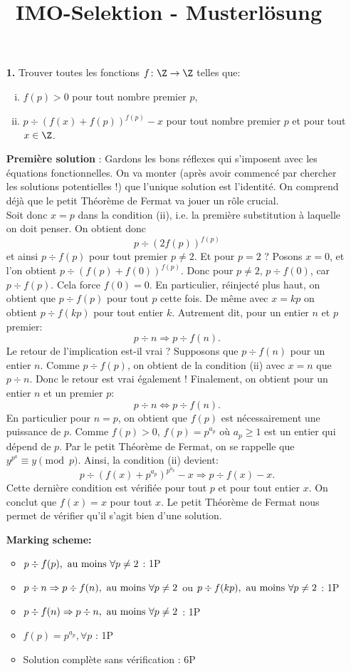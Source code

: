 \documentclass[language=german,style=solution]{smo}
\title{IMO-Selektion - Musterlösung}
\begin{document}
\begin{enumerate}

\item[\textbf{1.}] %
Trouver toutes les fonctions $f\colon \Z \to \Z$ telles que:
\begin{enumerate}[(i)] 
\item $f(p) > 0$ pour tout nombre premier $p$,
\item $p \div (f(x) + f(p))^{f(p)} - x$ pour tout nombre premier $p$ et pour tout $x \in \Z$. 
\end{enumerate}

\textbf{Première solution} : Gardons les bons réflexes qui s'imposent avec les équations fonctionnelles. On va monter (après avoir commencé par chercher les solutions potentielles !) que l'unique solution est l'identité. On comprend déjà que le petit Théorème de Fermat va jouer un rôle crucial.\\
Soit donc $x=p$ dans la condition (ii), i.e. la première substitution à laquelle on doit penser. On obtient donc
\[
p\div (2f(p))^{f(p)}
\]
et ainsi $p\div f(p)$ pour tout premier $p\neq 2$. Et pour $p=2$ ? Posons $x=0$, et l'on obtient $p\div (f(p)+f(0))^{f(p)}$. Donc pour $p\neq 2$, $p\div f(0)$, car $p\div f(p)$. Cela force $f(0)=0$. En particulier, réinjecté plus haut, on obtient que $p\div f(p)$ pour tout $p$ cette fois.\newline
De même avec $x=kp$ on obtient $p\div f(kp)$ pour tout entier $k$. Autrement dit, pour un entier $n$ et $p$ premier:
\[
p\div n\Rightarrow p\div f(n).
\]
Le retour de l'implication est-il vrai ? Supposons que $p\div f(n)$ pour un entier $n$. Comme $p\div f(p)$, on obtient de la condition (ii) avec $x=n$ que $p\div n$. Donc le retour est vrai également ! Finalement, on obtient pour un entier $n$ et un premier $p$:
\[
p\div n\Leftrightarrow p\div f(n).
\]
En particulier pour $n=p$, on obtient que $f(p)$ est nécessairement une puissance de $p$. Comme $f(p)>0$, $f(p)=p^{a_p}$ où $a_p\geq 1$ est un entier qui dépend de $p$. Par le petit Théorème de Fermat, on se rappelle que $y^{p^{a}}\equiv y\pmod{p}$. Ainsi, la condition (ii) devient:
\[
p\div (f(x)+p^{a_p})^{p^{a_p}}-x\Rightarrow p\div f(x)-x.
\]
Cette dernière condition est vérifiée pour tout $p$ et pour tout entier $x$. On conclut que $f(x)=x$ pour tout $x$. Le petit Théorème de Fermat nous permet de vérifier qu'il s'agit bien d'une solution.

\textbf{Marking scheme:}
\begin{itemize}
\item $p\div f(p),\textnormal{ au moins }\forall p\neq 2$ : 1P
\item $p\div n\Rightarrow p\div f(n),\textnormal{ au moins } \forall p\neq 2$ ou $p\div f(kp),\textnormal{ au moins } \forall p\neq 2$ : 1P
\item $p\div f(n)\Rightarrow p\div n, \textnormal{ au moins }\forall p\neq 2$ : 1P
\item $f(p)=p^{a_p}, \forall p$ : 1P
\item Solution complète sans vérification : 6P
\end{itemize}


\end{enumerate}
\end{document}
